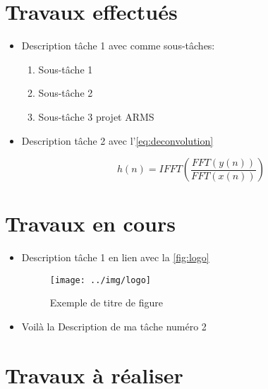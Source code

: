 \documentclass[12pt, a4paper]{article}
\begin{document}
\section{Travaux effectués}

\begin{itemize}
    \item Description tâche 1 avec comme sous-tâches:
          \begin{enumerate}
              \item Sous-tâche 1
              \item Sous-tâche 2
              \item Sous-tâche 3 projet ARMS
          \end{enumerate}
    \item Description tâche 2 avec l'\autoref{eq:deconvolution}

          \begin{equation}
              \label{eq:deconvolution}
              h(n) = IFFT \left( \frac{FFT(y(n))}{FFT(x(n))} \right)
          \end{equation}

\end{itemize}

\section{Travaux en cours}

\begin{itemize}
    \item Description tâche 1 en lien avec la \autoref{fig:logo}

          \begin{figure}[h!]
              \centering
              \texttt{[image: ../img/logo]}
              \caption{Exemple de titre de figure}
              \label{fig:logo}
          \end{figure}

    \item Voilà la Description de ma tâche numéro 2

\end{itemize}

\section{Travaux à réaliser}
\end{document}
